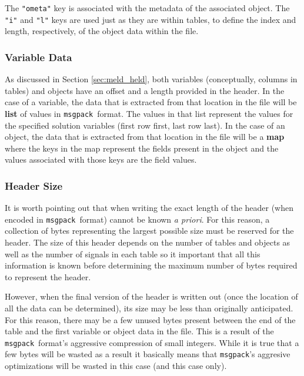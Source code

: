 \documentclass[11pt,a4paper,twocolumn]{article}
\newcommand{\msgpack}{\texttt{msgpack}}
\newcommand{\code}[1]{\texttt{#1}} %
\begin{document}
The \code{"ometa"} key is associated with the metadata of the
associated object.  The \code{"i"} and \code{"l"} keys are used just
as they are within tables, to define the index and length,
respectively, of the object data within the file.

\subsubsection{Variable Data}

As discussed in Section \ref{sec:meld_held}, both variables
(conceptually, columns in tables) and objects have an offset and a
length provided in the header.  In the case of a variable, the data
that is extracted from that location in the file will be \textbf{list}
of values in \msgpack\ format.  The values in that list represent the
values for the specified solution variables (first row first, last row
last).  In the case of an object, the data that is extracted from that
location in the file will be a \textbf{map} where the keys in the map
represent the fields present in the object and the values associated
with those keys are the field values.

\subsubsection{Header Size}


It is worth pointing out that when writing the exact length of the
header (when encoded in \msgpack\ format) cannot be known \textit{a
  priori}.  For this reason, a collection of bytes representing the
largest possible size must be reserved for the header.  The size of
this header depends on the number of tables and objects as well as the
number of signals in each table so it important that all this
information is known before determining the maximum number of bytes
required to represent the header.

However, when the final version of the header is written out (once the
location of all the data can be determined), its size may be less than
originally anticipated.  For this reason, there may be a few unused
bytes present between the end of the table and the first variable or
object data in the file.  This is a result of the \msgpack\ format's
aggressive compression of small integers.  While it is true that a few
bytes will be wasted as a result it basically means that \msgpack's
aggresive optimizations will be wasted in this case (and this case
only).
\end{document}
